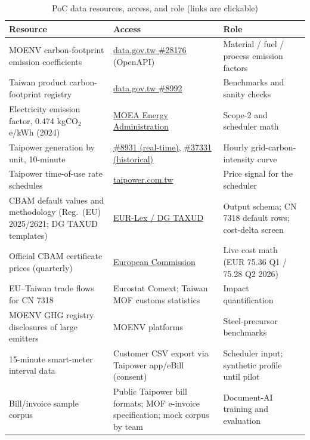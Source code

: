 \begin{table}[htbp]
\caption{PoC data resources, access, and role (links are clickable)}
\label{tab:datasets}
\small
\begin{tabularx}{\textwidth}{@{}p{}p{}X@{}}
\toprule
\textbf{Resource} & \textbf{Access} & \textbf{Role} \\
\midrule
MOENV carbon-footprint emission coefficients & \href{https://data.gov.tw/en/datasets/28176}{data.gov.tw \#28176} (OpenAPI) & Material / fuel / process emission factors \\
Taiwan product carbon-footprint registry & \href{https://data.gov.tw/en/datasets/8992}{data.gov.tw \#8992} & Benchmarks and sanity checks \\
Electricity emission factor, 0.474 kgCO$_2$e/kWh (2024) & \href{https://www.moeaea.gov.tw/ECW/English/content/Content.aspx?menu_id=24200}{MOEA Energy Administration} & Scope-2 and scheduler math \\
Taipower generation by unit, 10-minute & \href{https://data.gov.tw/en/datasets/8931}{\#8931 (real-time)}, \href{https://data.gov.tw/en/datasets/37331}{\#37331 (historical)} & Hourly grid-carbon-intensity curve \\
Taipower time-of-use rate schedules & \href{https://www.taipower.com.tw/2764/2765/2801/}{taipower.com.tw} & Price signal for the scheduler \\
CBAM default values and methodology (Reg.\ (EU) 2025/2621; DG TAXUD templates) & \href{https://taxation-customs.ec.europa.eu/carbon-border-adjustment-mechanism_en}{EUR-Lex / DG TAXUD} & Output schema; CN 7318 default rows; cost-delta screen \\
Official CBAM certificate prices (quarterly) & \href{https://taxation-customs.ec.europa.eu/carbon-border-adjustment-mechanism/price-cbam-certificates_en}{European Commission} & Live cost math (EUR 75.36 Q1 / 75.28 Q2 2026) \\
EU--Taiwan trade flows for CN 7318 & Eurostat Comext; Taiwan MOF customs statistics & Impact quantification \\
MOENV GHG registry disclosures of large emitters & MOENV platforms & Steel-precursor benchmarks \\
15-minute smart-meter interval data & Customer CSV export via Taipower app/eBill (consent) & Scheduler input; synthetic profile until pilot \\
Bill/invoice sample corpus & Public Taipower bill formats; MOF e-invoice specification; mock corpus by team & Document-AI training and evaluation \\
\bottomrule
\end{tabularx}
\end{table}

